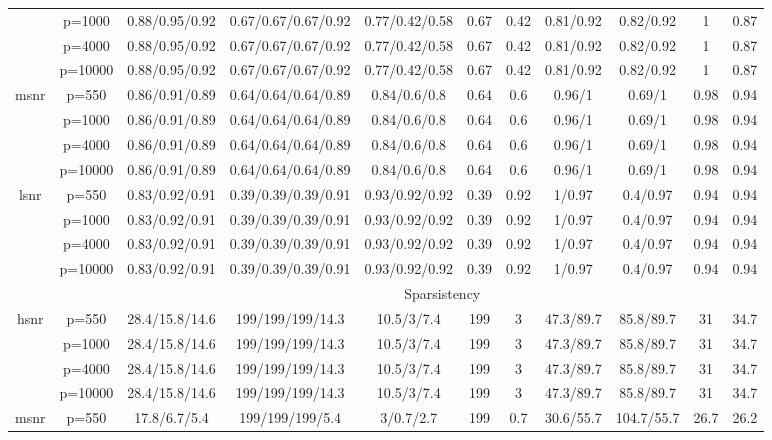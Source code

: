 \begin{table}[ht]
{\begin{tabular}{|c|c|ccccccccc|}
   & p=1000 & 0.88/0.95/0.92 & 0.67/0.67/0.67/0.92 & 0.77/0.42/0.58 & 0.67 & 0.42 & 0.81/0.92 & 0.82/0.92 & 1 & 0.87 \\ 
   & p=4000 & 0.88/0.95/0.92 & 0.67/0.67/0.67/0.92 & 0.77/0.42/0.58 & 0.67 & 0.42 & 0.81/0.92 & 0.82/0.92 & 1 & 0.87 \\ 
   & p=10000 & 0.88/0.95/0.92 & 0.67/0.67/0.67/0.92 & 0.77/0.42/0.58 & 0.67 & 0.42 & 0.81/0.92 & 0.82/0.92 & 1 & 0.87 \\ 
  \midrule\multirow{4}[2]{*}{msnr} & p=550 & 0.86/0.91/0.89 & 0.64/0.64/0.64/0.89 & 0.84/0.6/0.8 & 0.64 & 0.6 & 0.96/1 & 0.69/1 & 0.98 & 0.94 \\ 
   & p=1000 & 0.86/0.91/0.89 & 0.64/0.64/0.64/0.89 & 0.84/0.6/0.8 & 0.64 & 0.6 & 0.96/1 & 0.69/1 & 0.98 & 0.94 \\ 
   & p=4000 & 0.86/0.91/0.89 & 0.64/0.64/0.64/0.89 & 0.84/0.6/0.8 & 0.64 & 0.6 & 0.96/1 & 0.69/1 & 0.98 & 0.94 \\ 
   & p=10000 & 0.86/0.91/0.89 & 0.64/0.64/0.64/0.89 & 0.84/0.6/0.8 & 0.64 & 0.6 & 0.96/1 & 0.69/1 & 0.98 & 0.94 \\ 
  \midrule\multirow{4}[2]{*}{lsnr} & p=550 & 0.83/0.92/0.91 & 0.39/0.39/0.39/0.91 & 0.93/0.92/0.92 & 0.39 & 0.92 & 1/0.97 & 0.4/0.97 & 0.94 & 0.94 \\ 
   & p=1000 & 0.83/0.92/0.91 & 0.39/0.39/0.39/0.91 & 0.93/0.92/0.92 & 0.39 & 0.92 & 1/0.97 & 0.4/0.97 & 0.94 & 0.94 \\ 
   & p=4000 & 0.83/0.92/0.91 & 0.39/0.39/0.39/0.91 & 0.93/0.92/0.92 & 0.39 & 0.92 & 1/0.97 & 0.4/0.97 & 0.94 & 0.94 \\ 
   & p=10000 & 0.83/0.92/0.91 & 0.39/0.39/0.39/0.91 & 0.93/0.92/0.92 & 0.39 & 0.92 & 1/0.97 & 0.4/0.97 & 0.94 & 0.94 \\ 
   \midrule 
 \multicolumn{1}{|c}{} &       & \multicolumn{9}{c|}{Sparsistency} \\
\midrule\multirow{4}[2]{*}{hsnr} & p=550 & 28.4/15.8/14.6 & 199/199/199/14.3 & 10.5/3/7.4 & 199 & 3 & 47.3/89.7 & 85.8/89.7 & 31 & 34.7 \\ 
   & p=1000 & 28.4/15.8/14.6 & 199/199/199/14.3 & 10.5/3/7.4 & 199 & 3 & 47.3/89.7 & 85.8/89.7 & 31 & 34.7 \\ 
   & p=4000 & 28.4/15.8/14.6 & 199/199/199/14.3 & 10.5/3/7.4 & 199 & 3 & 47.3/89.7 & 85.8/89.7 & 31 & 34.7 \\ 
   & p=10000 & 28.4/15.8/14.6 & 199/199/199/14.3 & 10.5/3/7.4 & 199 & 3 & 47.3/89.7 & 85.8/89.7 & 31 & 34.7 \\ 
  \midrule\multirow{4}[2]{*}{msnr} & p=550 & 17.8/6.7/5.4 & 199/199/199/5.4 & 3/0.7/2.7 & 199 & 0.7 & 30.6/55.7 & 104.7/55.7 & 26.7 & 26.2 \\ 

\end{tabular}}
\end{table}
